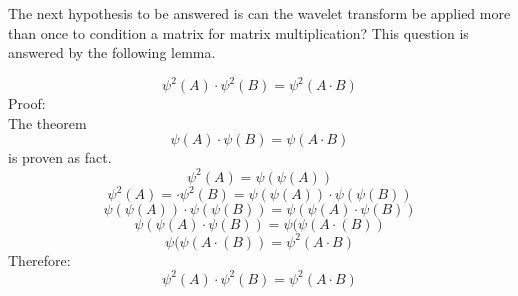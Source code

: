 The next hypothesis to be answered is can the wavelet transform be applied more than once to condition a matrix for matrix multiplication?  This question is answered by the following lemma.

\[ \psi ^2 (A) \cdot \psi^2 (B)  = \psi^2(A\cdot B) \]
Proof: \\
The theorem \[ \psi(A) \cdot \psi(B) = \psi (A\cdot B) \] is proven as fact.
\[ \psi^2(A) = \psi(\psi (A))\]
\[ \psi^2 (A) =\cdot \psi^2 (B) = \psi(\psi(A)) \cdot \psi (\psi (B))  \]
\[ \psi(\psi(A)) \cdot \psi (\psi (B)) = \psi (\psi(A) \cdot \psi(B) ) \]
\[ \psi (\psi(A) \cdot \psi(B) ) = \psi (\psi(A \cdot (B))  \]
\[ \psi (\psi(A \cdot (B)) = \psi^2(A \cdot B) \]
Therefore: 
\[ \psi ^2 (A) \cdot \psi^2 (B)= \psi^2(A \cdot B) \]


 

% 
